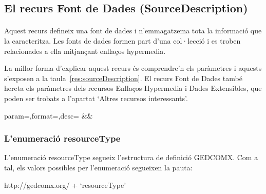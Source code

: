 \subsection{El recurs Font de Dades (SourceDescription)}

    \paragraph{}
    Aquest recurs defineix una font de dades i n'emmagatzema tota la informació que la caracteritza. Les fonts de dades formen part d'una col·lecció i es troben relacionades a ella mitjançant enllaços hypermedia.

    La millor forma d'explicar aquest recurs és comprendre'n els paràmetres i aquests s'exposen a la taula~\ref{res:sourceDescription}. El recurs Font de Dades també hereta els paràmetres dels recursos Enllaços Hypermedia i Dades Extensibles, que poden ser trobats a l'apartat `Altres recursos interessants'.

    \begin{center}
             {param=\param,format=\format,desc=\desc}
             {\param&\format&\desc}
     \end{center}


    \subsubsection{L'enumeració resourceType}

    L'enumeració resourceType segueix l'estructura de definició GEDCOMX. Com a tal, els valors possibles per l'enumeració segueixen la pauta:

    http://gedcomx.org/ + `resourceType'

